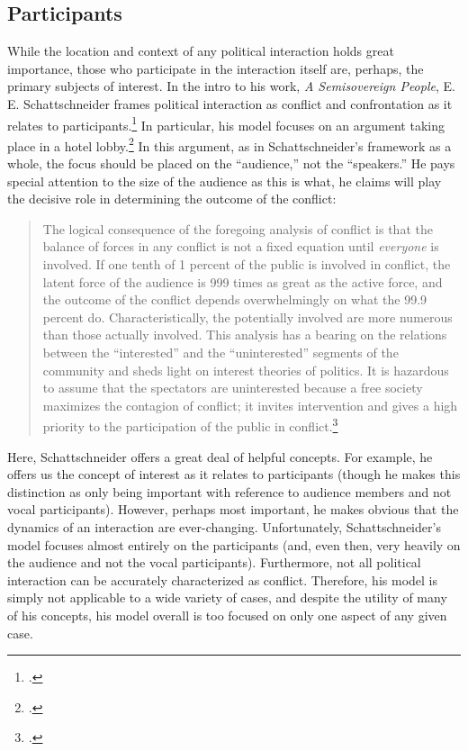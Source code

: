 \documentclass{article}
\begin{document}
\subsection{Participants}
While the location and context of any political interaction holds great importance, those who participate in the interaction itself are, perhaps, the primary subjects of interest. 
In the intro to his work, \emph{A Semisovereign People}, E. E. Schattschneider frames political interaction as conflict and confrontation as it relates to participants.\footcite{schattschneider75} 
In particular, his model focuses on an argument taking place in a hotel lobby.\footcite[1--5]{schattschneider75} 
In this argument, as in Schattschneider's framework as a whole, the focus should be placed on the ``audience,'' not the ``speakers.'' 
He pays special attention to the size of the audience as this is what, he claims will play the decisive role in determining the outcome of the conflict: 
\blockquote{The logical consequence of the foregoing analysis of conflict is that the balance of forces in any conflict is not a fixed equation until \emph{everyone} is involved. If one tenth of 1 percent of the public is involved in conflict, the latent force of the audience is 999 times as great as the active force, and the outcome of the conflict depends overwhelmingly on what the 99.9 percent do. Characteristically, the potentially involved are more numerous than those actually involved. This analysis has a bearing on the relations between the ``interested'' and the ``uninterested'' segments of the community and sheds light on interest theories of politics. It is hazardous to assume that the spectators are uninterested because a free society maximizes the contagion of conflict; it invites intervention and gives a high priority to the participation of the public in conflict.\footcite[5]{schattschneider75}}
Here, Schattschneider offers a great deal of helpful concepts. 
For example, he offers us the concept of interest as it relates to participants (though he makes this distinction as only being important with reference to audience members and not vocal participants). 
However, perhaps most important, he makes obvious that the dynamics of an interaction are ever-changing. 
Unfortunately, Schattschneider's model focuses almost entirely on the participants (and, even then, very heavily on the audience and not the vocal participants). 
Furthermore, not all political interaction can be accurately characterized as conflict. 
Therefore, his model is simply not applicable to a wide variety of cases, and despite the utility of many of his concepts, his model overall is too focused on only one aspect of any given case.
\end{document}
